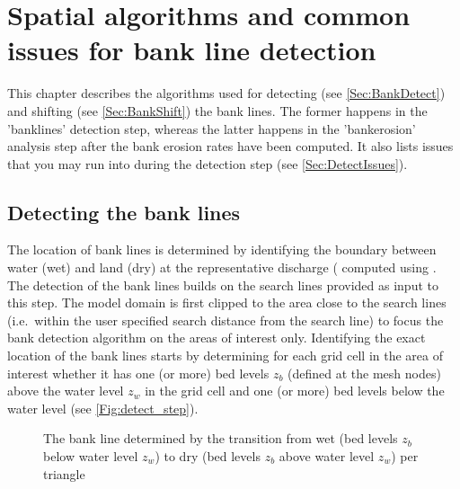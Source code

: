 \chapter{Spatial algorithms and common issues for bank line detection} \label{Chp:BankDetect}

This chapter describes the algorithms used for detecting (see \autoref{Sec:BankDetect}) and shifting (see \autoref{Sec:BankShift}) the bank lines.
The former happens in the 'banklines' detection step, whereas the latter happens in the 'bankerosion' analysis step after the bank erosion rates have been computed.
It also lists issues that you may run into during the detection step (see \autoref{Sec:DetectIssues}).

\section{Detecting the bank lines} \label{Sec:BankDetect}

The location of bank lines is determined by identifying the boundary between water (wet) and land (dry) at the representative discharge ( computed using \dflowfm.
The detection of the bank lines builds on the search lines provided as input to this step.
The model domain is first clipped to the area close to the search lines (i.e.~within the user specified search distance from the search line) to focus the bank detection algorithm on the areas of interest only.
Identifying the exact location of the bank lines starts by determining for each grid cell in the area of interest whether it has one (or more) bed levels $z_b$ (defined at the mesh nodes) above the water level $z_w$ in the grid cell and one (or more) bed levels below the water level (see \autoref{Fig:detect_step}).


\begin{figure}[!h]
\center
\resizebox{5cm}{!}{
   
}
\caption{The bank line determined by the transition from wet (bed levels $z_b$ below water level $z_w$) to dry (bed levels $z_b$ above water level $z_w$) per triangle}
\label{Fig:detect_step}
\end{figure}

